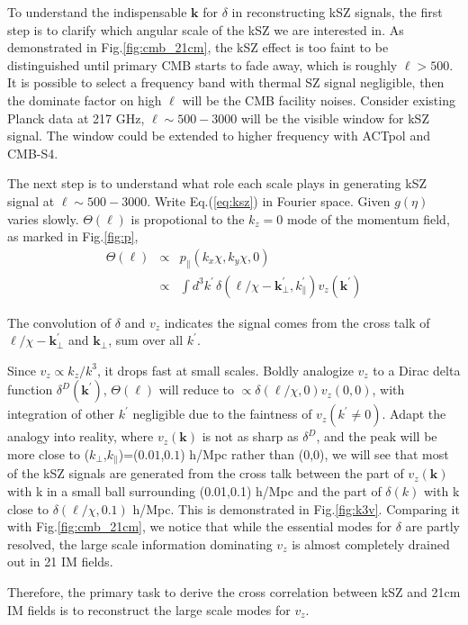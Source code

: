 To understand the indispensable $\bm{k}$ for $\delta$ 
in reconstructing kSZ signals, 
the first step is to clarify which angular scale of the kSZ  
we are interested in. 
As demonstrated in Fig.\ref{fig:cmb_21cm}, 
the kSZ effect is too faint to 
be distinguished until 
primary CMB starts to fade away, 
which is roughly $\ell>500$. 
It is possible to select a frequency band with thermal SZ signal negligible, 
then the dominate factor on high $\ell$ will be the CMB facility noises. 
Consider existing Planck \cite{Planck2015} data at 217 GHz, 
$\ell \sim 500-3000$ will be the visible window for kSZ signal. 
The window could be extended to higher frequency with 
ACTpol and CMB-S4. 


The next step is to understand what role each scale plays in generating kSZ signal 
at $\ell \sim 500-3000$. 
Write Eq.(\ref{eq:ksz}) in Fourier space. 
Given $g(\eta)$ varies slowly. 
$\Theta(\bm{\ell})$ is propotional to the $k_z=0$ mode of the momentum field, as marked in Fig.\ref{fig:p}, 
\begin{eqnarray}
    \label{eq:thetak}
    \Theta(\bm{\ell})&\propto&p_\parallel({k}_x\chi,{k}_y\chi,0)\\
    &\propto&\int 
    d^3k^\prime\,\delta(\bm{\ell}/\chi-\bm{k}_\perp^\prime,k_\parallel^\prime) v_z(\bm{k^\prime})\nonumber
    \end{eqnarray}

The convolution of $\delta$ and $v_z$ 
indicates the signal comes from the cross talk of 
$\bm{\ell}/\chi-\bm{k}_\perp^\prime$ and $\bm{k}_\perp$, 
sum over all $k^\prime$. 

Since $v_z \propto k_z/k^3$, 
it drops fast at small scales. 
Boldly analogize $v_z$ to a Dirac delta function $\delta^D(\bm{k}^\prime)$, 
$\Theta(\bm{\ell})$ will reduce to $\propto\delta(\bm{\ell}/\chi,0) v_z(0,0)$, 
with integration of other $k^\prime$ negligible due to the faintness of 
$v_z(k^\prime\neq0)$. 
Adapt the analogy into reality, 
where $v_z(\bm{k})$ 
is not as sharp as $\delta^D$, 
and the peak will be more close to 
($k_\perp$,$k_\parallel$)=($0.01$,$0.1$) h/Mpc 
rather than (0,0),
we will see  
that most of the kSZ signals are 
generated from the cross talk between the part of 
$v_z(\bm{k})$ with k in a small ball  
surrounding (0.01,0.1) h/Mpc 
and the part of $\delta(k)$ with k close to 
$\delta(\bm{\ell}/\chi,0.1)$ h/Mpc. 
This is demonstrated in Fig.\ref{fig:k3v}. 
Comparing it with Fig.\ref{fig:cmb_21cm}, 
we notice that while the 
essential modes for $\delta$ are partly resolved, 
the large scale information dominating $v_z$ is 
almost completely drained out in 21 IM fields.

Therefore, the primary task to derive the cross correlation 
between kSZ and 21cm IM fields is to reconstruct the 
large scale modes for $v_z$.
